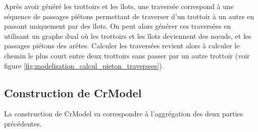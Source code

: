 Après avoir généré les trottoirs et les îlots, une traversée correspond à une séquence de passages piétons permettant de traverser d'un trottoir à un autre en passant uniquement par des îlots. On peut alors générer ces traversées en utilisant un graphe dual où les trottoirs et les îlots deviennent des nœuds, et les passages piétons des arêtes. Calculer les traversées revient alors à calculer le chemin le plus court entre deux trottoirs sans passer par un autre trottoir (voir figure \ref{fig:modelisation_calcul_pieton_traversees}).

\subsection{Construction de CrModel}

La construction de CrModel va correspondre à l'aggrégation des deux parties précédentes.

\todo{}